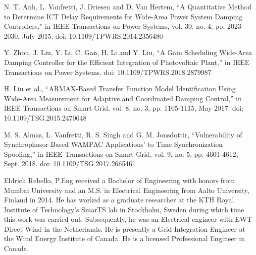 \documentclass{ieeeaccess}
\begin{document}
\begin{thebibliography}{00}
 N. T. Anh, L. Vanfretti, J. Driesen and D. Van Hertem, ``A Quantitative Method to Determine ICT Delay Requirements for Wide-Area Power System Damping Controllers,'' in IEEE Transactions on Power Systems, vol. 30, no. 4, pp. 2023-2030, July 2015.
doi: 10.1109/TPWRS.2014.2356480

 Y. Zhou, J. Liu, Y. Li, C. Gan, H. Li and Y. Liu, ``A Gain Scheduling Wide-Area Damping Controller for the Efficient Integration of Photovoltaic Plant,'' in IEEE Transactions on Power Systems. doi: 10.1109/TPWRS.2018.2879987

 H. Liu et al., ``ARMAX-Based Transfer Function Model Identification Using Wide-Area Measurement for Adaptive and Coordinated Damping Control,'' in IEEE Transactions on Smart Grid, vol. 8, no. 3, pp. 1105-1115, May 2017. doi: 10.1109/TSG.2015.2470648

 M. S. Almas, L. Vanfretti, R. S. Singh and G. M. Jonsdottir, ``Vulnerability of Synchrophasor-Based WAMPAC Applications’ to Time Synchronization Spoofing,'' in IEEE Transactions on Smart Grid, vol. 9, no. 5, pp. 4601-4612, Sept. 2018. doi: 10.1109/TSG.2017.2665461

\end{thebibliography}

\begin{IEEEbiography}{Eldrich Rebello, P.Eng}
received a Bachelor of Engineering with honors from Mumbai University and an M.S. in Electrical Engineering from Aalto University, Finland in 2014. He has worked as a graduate researcher at the KTH Royal Institute of Technology's SmarTS lab in Stockholm, Sweden during which time this work was carried out. Subsequently, he was an Electrical engineer with EWT Direct Wind in the Netherlands. He is presently a Grid Integration Engineer at the Wind Energy Institute of Canada. He is a licensed Professional Engineer in Canada.
\end{IEEEbiography}
\end{document}

